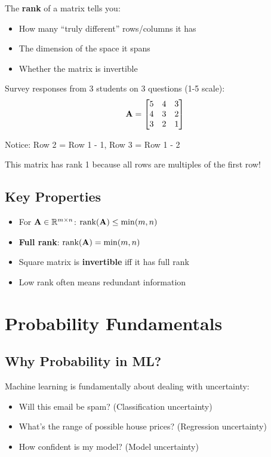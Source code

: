 \documentclass{article}
\newcounter{example}
\begin{document}
The \textbf{rank} of a matrix tells you:
\begin{itemize}
    \item How many ``truly different'' rows/columns it has
    \item The dimension of the space it spans
    \item Whether the matrix is invertible
\end{itemize}

\begin{tcolorbox}[colback=yellow!5!white,colframe=yellow!75!black,title=Example \stepcounter{example}\#\theexample: Student Survey Matrix]
Survey responses from 3 students on 3 questions (1-5 scale):
$$\mathbf{A} = \begin{bmatrix} 
5 & 4 & 3 \\
4 & 3 & 2 \\
3 & 2 & 1
\end{bmatrix}$$

Notice: Row 2 = Row 1 - 1, Row 3 = Row 1 - 2

This matrix has rank 1 because all rows are multiples of the first row!
\end{tcolorbox}

\subsection{Key Properties}
\begin{itemize}
    \item For $\mathbf{A} \in \mathbb{R}^{m \times n}$: $\text{rank}(\mathbf{A}) \leq \min(m,n)$
    \item \textbf{Full rank}: $\text{rank}(\mathbf{A}) = \min(m,n)$
    \item Square matrix is \textbf{invertible} iff it has full rank
    \item Low rank often means redundant information
\end{itemize}

\section{Probability Fundamentals}

\subsection{Why Probability in ML?}

Machine learning is fundamentally about dealing with uncertainty:
\begin{itemize}
    \item Will this email be spam? (Classification uncertainty)
    \item What's the range of possible house prices? (Regression uncertainty)  
    \item How confident is my model? (Model uncertainty)
\end{itemize}
\end{document}
